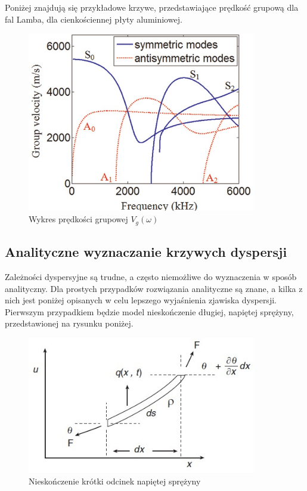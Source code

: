 Poniżej znajdują się przykładowe krzywe, przedstawiające prędkość grupową dla fal Lamba, dla cienkościennej płyty aluminiowej.

\begin{figure}[h]
\centering
\includegraphics[width=10cm]{Zdjecia/2/predkosc_grupowa_wykres}
\caption{Wykres prędkości grupowej \(V_g(\omega)\)}
\label{fig:preskodsc_grupow_wykres}
\end{figure}

\subsection{Analityczne wyznaczanie krzywych dyspersji}
Zależności dyspersyjne są trudne, a często niemożliwe do wyznaczenia w sposób analityczny. Dla prostych przypadków rozwiązania analityczne są znane, a kilka z nich jest poniżej opisanych w celu lepszego wyjaśnienia zjawiska dyspersji.
Pierwszym przypadkiem będzie model nieskończenie długiej, napiętej sprężyny, przedstawionej na rysunku poniżej.

\begin{figure}[h]
\centering
\includegraphics[width=10cm]{Zdjecia/2/dyspersja_analitycznie_sprezyna}
\caption{Nieskończenie krótki odcinek napiętej sprężyny}
\label{fig:nieskonczenie_krotki_odcinek_sprezyny}
\end{figure}

